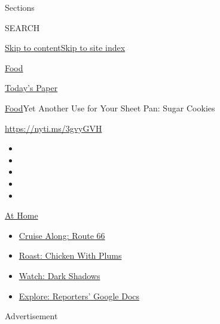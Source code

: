 Sections

SEARCH

\protect\hyperlink{site-content}{Skip to
content}\protect\hyperlink{site-index}{Skip to site index}

\href{https://www.nytimes3xbfgragh.onion/section/food}{Food}

\href{https://myaccount.nytimes3xbfgragh.onion/auth/login?response_type=cookie\&client_id=vi}{}

\href{https://www.nytimes3xbfgragh.onion/section/todayspaper}{Today's
Paper}

\href{/section/food}{Food}\textbar{}Yet Another Use for Your Sheet Pan:
Sugar Cookies

\url{https://nyti.ms/3gvyGVH}

\begin{itemize}
\item
\item
\item
\item
\item
\end{itemize}

\href{https://www.nytimes3xbfgragh.onion/spotlight/at-home?action=click\&pgtype=Article\&state=default\&region=TOP_BANNER\&context=at_home_menu}{At
Home}

\begin{itemize}
\tightlist
\item
  \href{https://www.nytimes3xbfgragh.onion/2020/09/07/travel/route-66.html?action=click\&pgtype=Article\&state=default\&region=TOP_BANNER\&context=at_home_menu}{Cruise
  Along: Route 66}
\item
  \href{https://www.nytimes3xbfgragh.onion/2020/09/04/dining/sheet-pan-chicken.html?action=click\&pgtype=Article\&state=default\&region=TOP_BANNER\&context=at_home_menu}{Roast:
  Chicken With Plums}
\item
  \href{https://www.nytimes3xbfgragh.onion/2020/09/04/arts/television/dark-shadows-stream.html?action=click\&pgtype=Article\&state=default\&region=TOP_BANNER\&context=at_home_menu}{Watch:
  Dark Shadows}
\item
  \href{https://www.nytimes3xbfgragh.onion/interactive/2020/at-home/even-more-reporters-editors-diaries-lists-recommendations.html?action=click\&pgtype=Article\&state=default\&region=TOP_BANNER\&context=at_home_menu}{Explore:
  Reporters' Google Docs}
\end{itemize}

Advertisement

